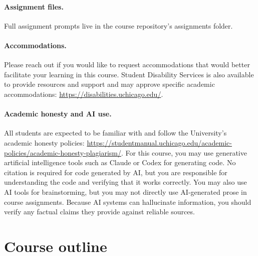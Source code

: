 \documentclass[letterpaper, 12pt, parskip=full, DIV=10]{scrartcl}
\begin{document}
\paragraph{Assignment files.}
Full assignment prompts live in the course repository's assignments folder. 

\paragraph{Accommodations.}
Please reach out if you would like to request accommodations that would better facilitate your learning in this course. Student Disability Services is also available to provide resources and support and may approve specific academic accommodations: \url{https://disabilities.uchicago.edu/}.

\paragraph{Academic honesty and AI use.}
All students are expected to be familiar with and follow the University's academic honesty policies: \url{https://studentmanual.uchicago.edu/academic-policies/academic-honesty-plagiarism/}. 
For this course, you may use generative artificial intelligence tools such as Claude or Codex for generating code. 
No citation is required for code generated by AI, but you are responsible for understanding the code and verifying that it works correctly. 
You may also use AI tools for brainstorming, but you may not directly use AI-generated prose in course assignments. 
Because AI systems can hallucinate information, you should verify any factual claims they provide against reliable sources.

\section*{Course outline}
\end{document}
